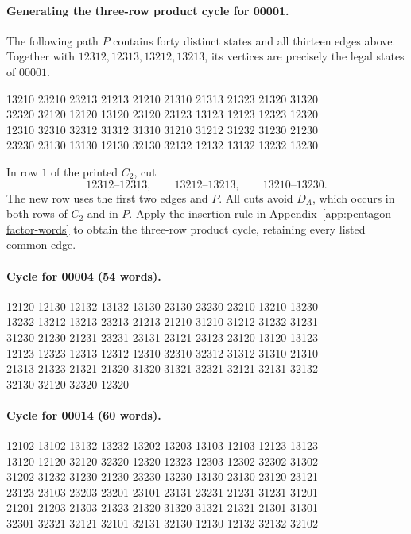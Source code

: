 \paragraph{Generating the three-row product cycle for 00001.}
The following path $P$ contains forty distinct states and all
thirteen edges above. Together with $12312,12313,13212,13213$,
its vertices are precisely the legal states of $00001$.
\begingroup\footnotesize\ttfamily\begin{flushleft}
13210 23210 23213 21213 21210 21310 21313 21323 21320 31320\\
32320 32120 12120 13120 23120 23123 13123 12123 12323 12320\\
12310 32310 32312 31312 31310 31210 31212 31232 31230 21230\\
23230 23130 13130 12130 32130 32132 12132 13132 13232 13230\\
\end{flushleft}\endgroup
In row $1$ of the printed $C_2$, cut
\[
12312\text{--}12313,\qquad13212\text{--}13213,\qquad
13210\text{--}13230.
\]
The new row uses the first two edges and $P$. All cuts avoid
$D_A$, which occurs in both rows of $C_2$ and in $P$. Apply the
insertion rule in Appendix~\ref{app:pentagon-factor-words} to obtain
the three-row product cycle, retaining every listed common edge.
\paragraph{Cycle for 00004 (54 words).}
\begingroup\footnotesize\ttfamily\begin{flushleft}
12120 12130 12132 13132 13130 23130 23230 23210 13210 13230\\
13232 13212 13213 23213 21213 21210 31210 31212 31232 31231\\
31230 21230 21231 23231 23131 23121 23123 23120 13120 13123\\
12123 12323 12313 12312 12310 32310 32312 31312 31310 21310\\
21313 21323 21321 21320 31320 31321 32321 32121 32131 32132\\
32130 32120 32320 12320\\
\end{flushleft}\endgroup
\paragraph{Cycle for 00014 (60 words).}
\begingroup\footnotesize\ttfamily\begin{flushleft}
12102 13102 13132 13232 13202 13203 13103 12103 12123 13123\\
13120 12120 32120 32320 12320 12323 12303 12302 32302 31302\\
31202 31232 31230 21230 23230 13230 13130 23130 23120 23121\\
23123 23103 23203 23201 23101 23131 23231 21231 31231 31201\\
21201 21203 21303 21323 21320 31320 31321 21321 21301 31301\\
32301 32321 32121 32101 32131 32130 12130 12132 32132 32102\\
\end{flushleft}\endgroup
